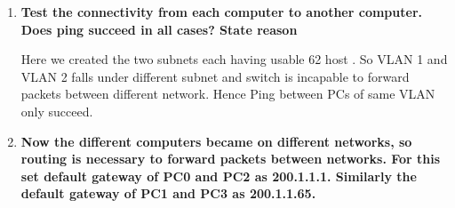 \documentclass[a4paper,11pt]{article}
\begin{document}
\begin{enumerate}

    \item\textbf{  Test the connectivity from each computer to another computer. Does ping succeed in all
              cases? State reason}









          Here we created the two subnets each having usable 62  host . So VLAN 1 and VLAN 2 falls under different subnet and switch is incapable to forward packets between different network. Hence Ping between PCs of same VLAN only succeed.

    \item\textbf{ Now the different computers became on different networks, so routing is necessary to
              forward packets between networks. For this set default gateway of PC0 and PC2 as
              200.1.1.1. Similarly the default gateway of PC1 and PC3 as 200.1.1.65.}


\end{enumerate}
\end{document}

